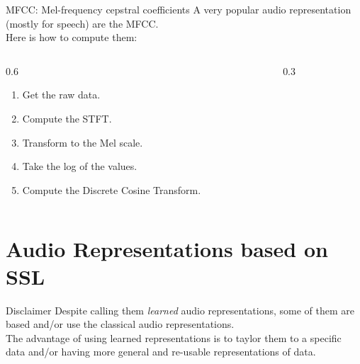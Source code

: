 \documentclass[11pt,aspectratio=169,usenames,dvipsnames]{beamer}
\begin{document}
\begin{frame}{MFCC: Mel-frequency cepstral coefficients}
A very popular audio representation (mostly for speech) are the MFCC.\\
Here is how to compute them:
\begin{columns}
\begin{column}{0.6\textwidth}
\begin{enumerate}
    \item Get the raw data.
    \item Compute the STFT.
    \item Transform to the Mel scale.
    \item Take the log of the values.
    \item Compute the Discrete Cosine Transform.
\end{enumerate}
\end{column}
\begin{column}{0.3\textwidth}
\end{column}
\end{columns}
\end{frame}

\section{Audio Representations based on SSL}

\begin{frame}{Disclaimer}
Despite calling them \textit{learned} audio representations, some of them are based and/or use the classical audio representations.\vspace{\baselineskip}\\

The advantage of using learned representations is to taylor them to a specific data and/or having more general and re-usable representations of data.
\end{frame}
\end{document}

